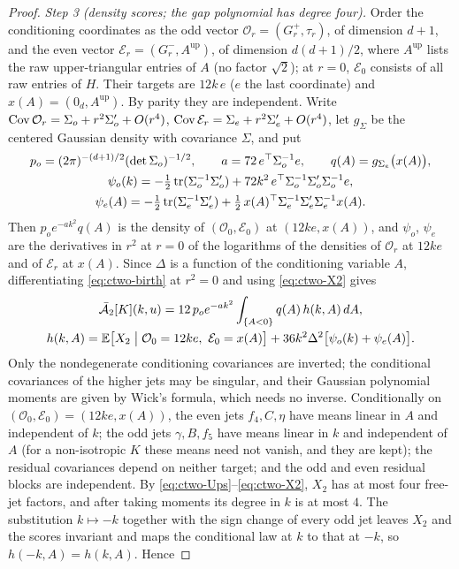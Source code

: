 \begin{proof}
\emph{Step 3 (density scores; the gap polynomial has degree four).} Order the conditioning coordinates as the odd vector $\mathcal O_r=(G^+_r,\tau_r)$, of dimension $d+1$, and the even vector $\mathcal E_r=(G^-_r,A^{\mathrm{up}})$, of dimension $d(d+1)/2$, where $A^{\mathrm{up}}$ lists the raw upper-triangular entries of $A$ (no factor $\sqrt2$); at $r=0$, $\mathcal E_0$ consists of all raw entries of $H$. Their targets are $12k\,e$ ($e$ the last coordinate) and $x(A)=(0_d,A^{\mathrm{up}})$. By parity they are independent. Write $\operatorname{Cov}\mathcal O_r=\Sigma_o+r^2\Sigma_o'+O(r^4)$, $\operatorname{Cov}\mathcal E_r=\Sigma_e+r^2\Sigma_e'+O(r^4)$, let $g_\Sigma$ be the centered Gaussian density with covariance $\Sigma$, and put
\begin{equation}\label{eq:ctwo-scores}
\begin{gathered}
p_o=(2\pi)^{-(d+1)/2}(\det\Sigma_o)^{-1/2},\qquad a=72\,e^{\top}\Sigma_o^{-1}e,\qquad q(A)=g_{\Sigma_e}\bigl(x(A)\bigr),\\
\psi_o(k)=-\tfrac12\operatorname{tr}(\Sigma_o^{-1}\Sigma_o')+72k^2\,e^{\top}\Sigma_o^{-1}\Sigma_o'\Sigma_o^{-1}e,\\
\psi_e(A)=-\tfrac12\operatorname{tr}(\Sigma_e^{-1}\Sigma_e')+\tfrac12\,x(A)^{\top}\Sigma_e^{-1}\Sigma_e'\Sigma_e^{-1}x(A).
\end{gathered}
\end{equation}
Then $p_oe^{-ak^2}q(A)$ is the density of $(\mathcal O_0,\mathcal E_0)$ at $(12ke,x(A))$, and $\psi_o$, $\psi_e$ are the derivatives in $r^2$ at $r=0$ of the logarithms of the densities of $\mathcal O_r$ at $12ke$ and of $\mathcal E_r$ at $x(A)$. Since $\Delta$ is a function of the conditioning variable $A$, differentiating \eqref{eq:ctwo-birth} at $r^2=0$ and using \eqref{eq:ctwo-X2} gives
\begin{equation}\label{eq:ctwo-A2bar}
\begin{gathered}
\bar{\mathcal A}_2[K](k,u)=12\,p_oe^{-ak^2}\int_{\{A<0\}}q(A)\,h(k,A)\,dA,\\
h(k,A)=\mathbb E\bigl[X_2\bigm|\mathcal O_0=12ke,\ \mathcal E_0=x(A)\bigr]+36k^2\Delta^2\bigl[\psi_o(k)+\psi_e(A)\bigr].
\end{gathered}
\end{equation}
Only the nondegenerate conditioning covariances are inverted; the conditional covariances of the higher jets may be singular, and their Gaussian polynomial moments are given by Wick's formula, which needs no inverse. Conditionally on $(\mathcal O_0,\mathcal E_0)=(12ke,x(A))$, the even jets $f_4,C,\eta$ have means linear in $A$ and independent of $k$; the odd jets $\gamma,B,f_5$ have means linear in $k$ and independent of $A$ (for a non-isotropic $K$ these means need not vanish, and they are kept); the residual covariances depend on neither target; and the odd and even residual blocks are independent. By \eqref{eq:ctwo-Ups}--\eqref{eq:ctwo-X2}, $X_2$ has at most four free-jet factors, and after taking moments its degree in $k$ is at most $4$. The substitution $k\mapsto-k$ together with the sign change of every odd jet leaves $X_2$ and the scores invariant and maps the conditional law at $k$ to that at $-k$, so $h(-k,A)=h(k,A)$. Hence

\end{proof}
